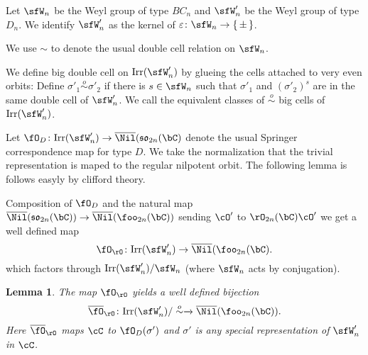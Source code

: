 \documentclass[12pt,a4paper]{amsart}
\def\fsp{\mathfrak{sp}}
\def\fso{\mathfrak{so}}
\numberwithin{equation}{section}
\newtheorem{lem}[thm]{Lemma}
\theoremstyle{remark}
\def\tdLS{\tilde{\mathrm{d}}_{\mathrm{LS}}}
\def\tdSP{\tilde{\mathrm{d}}_{\mathrm{SP}}}
\begin{document}
\def\msim{\stackrel{m}{\sim}}
\def\osim{\stackrel{o}{\sim}}

\def\Irr{\mathrm{Irr}}
\def\bNil{\overline{\Nil}}
\def\bNilSP{\bNil(\fsp_{2n}(\bC))}

\def\Irrms{\Irr^{\mathrm ms}}
\def\Irrsp{\Irr^{\mathrm sp}}

\def\tdLS{\tilde{\mathrm d}_{\mathrm LS}}
\def\tdSP{\tilde{\mathrm d}_{\mathrm SP}}

\def\Springer{\fO}
\def\SpringerD{\fO_D}
\def\SpringerO{\fO_{\rO}}
\def\bSpringerO{\overline{\fO}_{\rO}}
\def\RSp{\fR_C}
\def\RRD{\fR_D}

\def\cuprow{\stackrel{r}{\sqcup}}
\def\cupcol{\stackrel{c}{\sqcup}}

Let $\sfW_{n}$ be the Weyl group of type $BC_{n}$ and $\sfW'_{n}$ be the Weyl
group of type $D_{n}$. We identify $\sfW'_{n}$ as the kernel of
$\varepsilon\colon \sfW_{n}\rightarrow \set{\pm}$.

We use $\sim$ to denote the usual double cell relation on $\sfW_{n}$.

We define big double cell on $\Irr(\sfW'_{n})$ by glueing the cells attached to
very even orbits:
Define $\sigma'_{1}\osim \sigma'_{2}$ if there is $s\in \sfW_{n}$ such that
$\sigma'_{1}$ and $(\sigma'_{2})^{s}$ are in the same double cell of $\sfW'_{n}$.
We call the equivalent classes of $\osim$ big cells of $\Irr(\sfW'_{n})$.


Let $\SpringerD\colon \Irr(\sfW'_{n}) \rightarrow  \bNil(\fso_{2n}(\bC)$ denote
the usual Springer correspondence map for type $D$. We take the normalization
that the trivial representation is maped to the regular nilpotent orbit.
The following lemma is follows easyly by clifford theory.

Composition of $\SpringerD$ and the natural map
$\bNil(\fso_{2n}(\bC))\rightarrow \bNil(\foo_{2n}(\bC))$ sending $\cO'$ to
$\rO_{2n}(\bC)\cO'$ we get a well defined map
\[
\SpringerO\colon  \Irr(\sfW'_{n}) \rightarrow  \bNil(\foo_{2n}(\bC).
\]
which factors through $\Irr(\sfW'_{n})/\sfW_{n}$ (where $\sfW_{n}$ acts by
conjugation).


\begin{lem}
 The map $\SpringerO$ yields a well defined bijection
  \[
   \bSpringerO\colon  \Irr(\sfW'_{n})/\osim \xrightarrow{ } \bNil(\foo_{2n}(\bC)).
  \]
  Here $\bSpringerO$ maps $\cC$ to $ \SpringerD(\sigma')$ and
  $\sigma'$ is any special representation of $\sfW'_{n}$ in $\cC$.
\end{lem}
\end{document}

